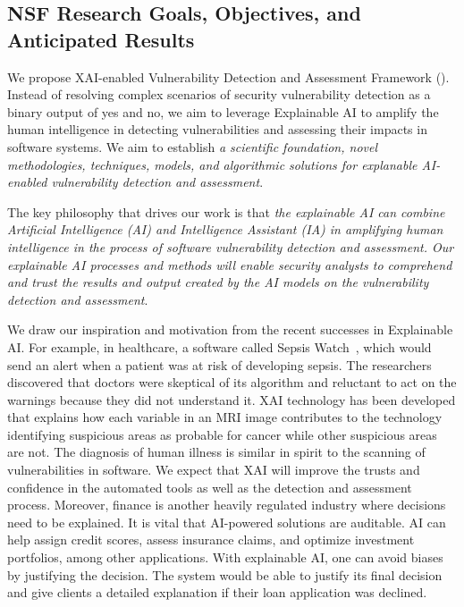 \subsection{NSF Research Goals, Objectives, and Anticipated Results}

We propose XAI-enabled Vulnerability Detection and Assessment
Framework ({\tool}). Instead of resolving complex scenarios of
security vulnerability detection as a binary output of yes and no, we
aim to leverage Explainable AI to amplify the human intelligence in
detecting vulnerabilities and assessing their impacts in software
systems. We aim to establish {\em a scientific foundation, novel
  methodologies, techniques, models, and algorithmic solutions for
  explanable AI-enabled vulnerability detection and assessment}.

\begin{center}
\begin{minipage}{36em}
The key philosophy that drives our work is that {\em the explainable
  AI can combine Artificial Intelligence (AI) and Intelligence Assistant (IA) in amplifying
  human intelligence in the process of software vulnerability
  detection and assessment. Our explainable AI processes and methods
  will enable security analysts to comprehend and trust the results
  and output created by the AI models on the vulnerability detection and
  assessment}.
    \end{minipage}
\end{center}

We draw our inspiration and motivation from the recent successes in
Explainable AI. For example, in healthcare, a software called Sepsis
Watch~\cite{sepsis-watch}, which would send an alert when a patient
was at risk of developing sepsis. The researchers discovered that
doctors were skeptical of its algorithm and reluctant to act on the
warnings because they did not understand it. XAI technology has been
developed that explains how each variable in an MRI image contributes
to the technology identifying suspicious areas as probable for cancer
while other suspicious areas are not. The diagnosis of human illness
is similar in spirit to the scanning of vulnerabilities in software.
We expect that XAI will improve the trusts and confidence in the
automated tools as well as the detection and assessment process.
Moreover, finance is another heavily regulated industry where
decisions need to be explained. It is vital that AI-powered solutions
are auditable. AI can help assign credit scores, assess insurance
claims, and optimize investment portfolios, among other applications.
With explainable AI, one can avoid biases by justifying the decision.
The system would be able to justify its final decision and give
clients a detailed explanation if their loan application was declined.

